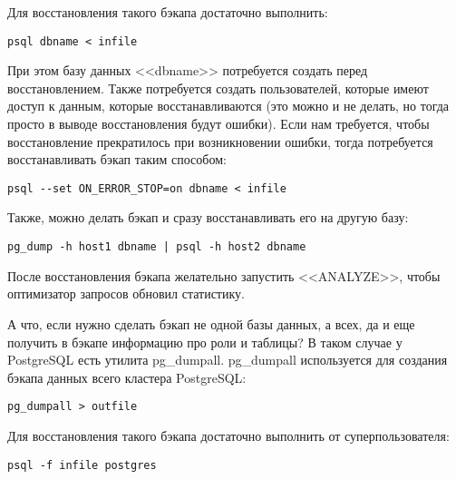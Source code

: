 Для восстановления такого бэкапа достаточно выполнить:
\begin{lstlisting}[label=lst:backups2,caption=Восстанавливаем бэкап]
psql dbname < infile
\end{lstlisting}

При этом базу данных <<dbname>> потребуется создать перед восстановлением. Также потребуется создать пользователей, 
которые имеют доступ к данным, которые восстанавливаются (это можно и не делать, но тогда просто в выводе восстановления будут ошибки).
Если нам требуется, чтобы восстановление прекратилось при возникновении ошибки, тогда потребуется восстанавливать бэкап таким способом:
\begin{lstlisting}[label=lst:backups3,caption=Восстанавливаем бэкап]
psql --set ON_ERROR_STOP=on dbname < infile
\end{lstlisting}

Также, можно делать бэкап и сразу восстанавливать его на другую базу:
\begin{lstlisting}[label=lst:backups4,caption=Бекап в другую БД]
pg_dump -h host1 dbname | psql -h host2 dbname
\end{lstlisting}

После восстановления бэкапа желательно запустить <<ANALYZE>>, чтобы оптимизатор запросов обновил статистику.

А что, если нужно сделать бэкап не одной базы данных, а всех, да и еще получить в бэкапе информацию про роли и таблицы? 
В таком случае у PostgreSQL есть утилита pg\_dumpall. pg\_dumpall используется для создания бэкапа данных всего кластера PostgreSQL:
\begin{lstlisting}[label=lst:backups5,caption=Бекап кластера PostgreSQL]
pg_dumpall > outfile
\end{lstlisting}

Для восстановления такого бэкапа достаточно выполнить от суперпользователя:
\begin{lstlisting}[label=lst:backups6,caption=Восстановления бэкапа PostgreSQL]
psql -f infile postgres
\end{lstlisting}

